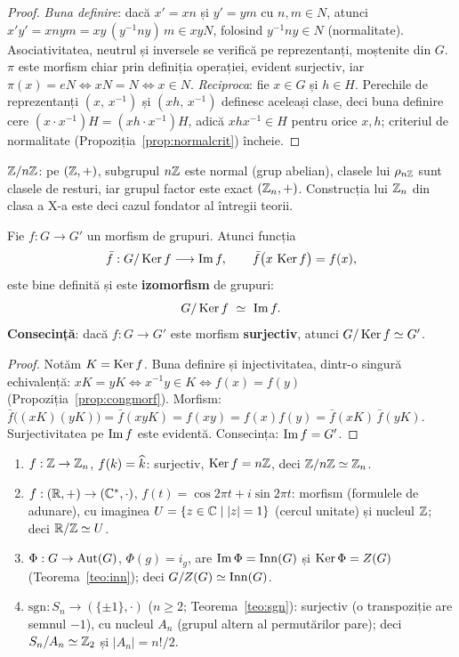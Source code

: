 \begin{proof}
\emph{Buna definire}: dacă $x'=xn$ și $y'=ym$ cu $n,m\in N$, atunci $x'y'=xnym=xy\,(y^{-1}ny)\,m\in xyN$, folosind $y^{-1}ny\in N$ (normalitate). Asociativitatea, neutrul și inversele se verifică pe reprezentanți, moștenite din $G$. $\pi$ este morfism chiar prin definiția operației, evident surjectiv, iar $\pi(x)=eN\iff xN=N\iff x\in N$.
\emph{Reciproca}: fie $x\in G$ și $h\in H$. Perechile de reprezentanți $(x,\,x^{-1})$ și $(xh,\,x^{-1})$ definesc aceleași clase, deci buna definire cere $(x\cdot x^{-1})H=(xh\cdot x^{-1})H$, adică $xhx^{-1}\in H$ pentru orice $x,h$; criteriul de normalitate (Propoziția~\ref{prop:normalcrit}) încheie.
\end{proof}

\begin{exemplu}
$\mathbb{Z}/n\mathbb{Z}$: pe $(\mathbb{Z},+)$, subgrupul $n\mathbb{Z}$ este normal (grup abelian), clasele lui $\rho_{n\mathbb{Z}}$ sunt clasele de resturi, iar grupul factor este exact $(\mathbb{Z}_n,+)$. Construcția lui $\mathbb{Z}_n$ din clasa a X-a este deci cazul fondator al întregii teorii.
\end{exemplu}

\begin{teorema}\label{teo:fundamental}
Fie $f:G\to G'$ un morfism de grupuri. Atunci funcția
\[
\bar f:G/\operatorname{Ker} f\longrightarrow\operatorname{Im} f,\qquad\bar f\bigl(x\,\operatorname{Ker} f\bigr)=f(x),
\]
este bine definită și este \textbf{izomorfism} de grupuri:
\[
G/\operatorname{Ker} f\ \simeq\ \operatorname{Im} f .
\]
\textbf{Consecință}: dacă $f:G\to G'$ este morfism \textbf{surjectiv}, atunci $G/\operatorname{Ker} f\simeq G'$.
\end{teorema}

\begin{proof}
Notăm $K=\operatorname{Ker} f$. Buna definire și injectivitatea, dintr-o singură echivalență: $xK=yK\iff x^{-1}y\in K\iff f(x)=f(y)$ (Propoziția~\ref{prop:congmorf}). Morfism: $\bar f\bigl((xK)(yK)\bigr)=\bar f(xyK)=f(xy)=f(x)f(y)=\bar f(xK)\,\bar f(yK)$. Surjectivitatea pe $\operatorname{Im} f$ este evidentă. Consecința: $\operatorname{Im} f=G'$.
\end{proof}

\begin{exemplu}\label{ex:fundamental}
\begin{enumerate}[label=(\alph*),nosep]
\item $f:\mathbb{Z}\to\mathbb{Z}_n$, $f(k)=\widehat{k}$: surjectiv, $\operatorname{Ker} f=n\mathbb{Z}$, deci $\mathbb{Z}/n\mathbb{Z}\simeq\mathbb{Z}_n$.
\item $f:(\mathbb{R},+)\to(\mathbb{C}^*,\cdot)$, $f(t)=\cos2\pi t+i\sin2\pi t$: morfism (formulele de adunare), cu imaginea $U=\{z\in\mathbb{C}\mid|z|=1\}$ (cercul unitate) și nucleul $\mathbb{Z}$; deci $\mathbb{R}/\mathbb{Z}\simeq U$.
\item $\Phi:G\to\operatorname{Aut}(G)$, $\Phi(g)=i_g$, are $\operatorname{Im}\Phi=\operatorname{Inn}(G)$ și $\operatorname{Ker}\Phi=Z(G)$ (Teorema~\ref{teo:inn}); deci $G/Z(G)\simeq\operatorname{Inn}(G)$.
\item $\mathrm{sgn}:S_n\to(\{\pm1\},\cdot)$ ($n\ge2$; Teorema~\ref{teo:sgn}): surjectiv (o transpoziție are semnul $-1$), cu nucleul $A_n$ (grupul altern al permutărilor pare); deci $S_n/A_n\simeq\mathbb{Z}_2$ și $|A_n|=n!/2$.
\end{enumerate}
\end{exemplu}

